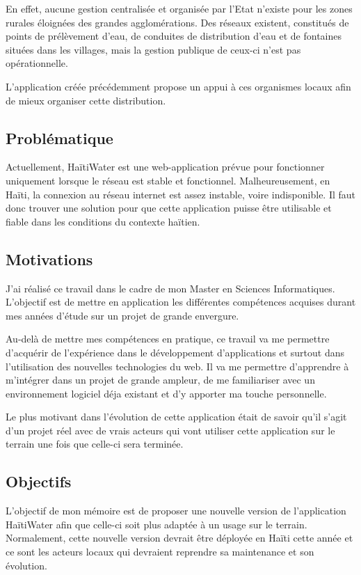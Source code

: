 \documentclass{EPL-master-thesis-covers-FR}
\begin{document}
			 En effet, aucune gestion centralisée et organisée par l'Etat n'existe pour les zones rurales éloignées des grandes agglomérations. Des réseaux existent, constitués de points de prélèvement d'eau, de conduites de distribution d'eau et de fontaines situées dans les villages, mais la gestion publique de ceux-ci n'est pas opérationnelle. 

			L'application créée précédemment \cite{ref:haitiwater} propose un appui à ces organismes locaux afin de mieux organiser cette distribution. 

			

		\subsection*{Problématique}
			Actuellement, HaïtiWater est une web-application prévue pour fonctionner uniquement lorsque le réseau est stable et fonctionnel. Malheureusement, en Haïti, la connexion au réseau internet est assez instable, voire indisponible. Il faut donc trouver une solution pour que cette application puisse être utilisable et fiable dans les conditions du contexte haïtien. 


		\subsection*{Motivations}
			J'ai réalisé ce travail dans le cadre de mon Master en Sciences Informatiques. L'objectif est de mettre en application les différentes compétences acquises durant mes années d'étude sur un projet de grande envergure.
			
			Au-delà de mettre mes compétences en pratique, ce travail va me permettre d'acquérir de l'expérience dans le développement d'applications et surtout dans l'utilisation des nouvelles technologies du web. Il va me permettre d'apprendre à m'intégrer dans un projet de grande ampleur, de me familiariser avec un environnement logiciel déja existant et d'y apporter ma touche personnelle.	
			
			Le plus motivant dans l'évolution de cette application était de savoir qu'il s'agit d'un projet réel avec de vrais acteurs qui vont utiliser cette application sur le terrain une fois que celle-ci sera terminée.


		\subsection*{Objectifs}
			L'objectif de mon mémoire est de proposer une nouvelle version de l'application HaïtiWater afin que celle-ci soit plus adaptée à un usage sur le terrain. Normalement, cette nouvelle version devrait être déployée en Haïti cette année et ce sont les acteurs locaux qui devraient reprendre sa maintenance et son évolution.
			
\end{document}
